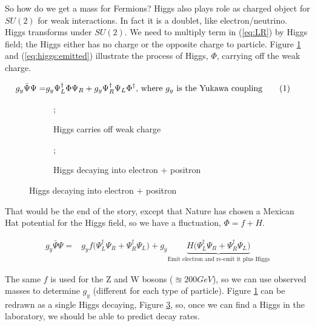 \documentclass[]{article}
\newcommand\numberthis{\addtocounter{equation}{1}\tag{\theequation}}
\begin{document}
So how do we get a mass for Fermions? Higgs also plays role as charged object for $SU(2)$ for weak interactions. In fact it is a doublet, like electron/neutrino. Higgs transforms under $SU(2)$. We need to multiply term in (\ref{eq:LR}) by Higgs field; the Higgs either has no charge or the opposite charge to particle. Figure \ref{fig:2-10-Higgs-emitted} and (\ref{eq:higgs:emitted}) illustrate the process of Higgs, $\Phi$, carrying off the weak charge.

\begin{align*}
	g_y \bar{\Psi}\Psi =& g_y \Psi^\dagger_L \Phi \Psi_R + g_y \Psi^\dagger_R \Psi_L \Phi^\dagger \text{, where $g_y$ is the Yukawa coupling} \numberthis \label{eq:higgs:emitted}
\end{align*}

\begin{figure}[H]
	\caption[Higgs interacting with Fermions]{Higgs interacting with Fermions: two forms of the same diagram}
	\begin{subfigure}[t]{0.45\textwidth}
		\caption{Higgs carries off weak charge}\label{fig:2-10-Higgs-emitted}
		;
	\end{subfigure}
	\begin{subfigure}[t]{0.45\textwidth}
		\caption{Higgs decaying into electron + positron}\label{fig:2-10-Higgs-decaying}
		;
	\end{subfigure}
\end{figure}

That would be the end of the story, except that Nature has chosen a Mexican Hat potential for the Higgs field, so we have a fluctuation, $\Phi=f+H$.

\begin{align*}
	g_y \bar{\Psi}\Psi =& g_y f \big(\Psi^\dagger_L  \Psi_R +  \Psi^\dagger_R \Psi_L  \big) + g_y\underbrace{ H \big(\Psi^\dagger_L  \Psi_R +  \Psi^\dagger_R \Psi_L  \big)}_\text{Emit electron and re-emit it plus Higgs}
\end{align*}

The same $f$ is used for the Z and W bosons ($\approxeq200GeV$), so we can use observed masses to determine $g_y$ (different for each type of particle). Figure \ref{fig:2-10-Higgs-emitted} can be redrawn as a single Higgs decaying, Figure \ref{fig:2-10-Higgs-decaying}, so, once we can find a Higgs in the laboratory, we should be able to predict decay rates.
\end{document}
